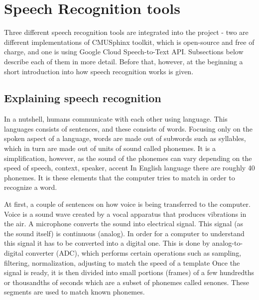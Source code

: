 \section{Speech Recognition tools}

Three different speech recognition tools are integrated into the project - two are different implementations of CMUSphinx toolkit, which is open-source and free of charge, and one is using Google Cloud Speech-to-Text API. Subsections below describe each of them in more detail. Before that, however, at the beginning a short introduction into how speech recognition works is given.

\subsection{Explaining speech recognition}

In a nutshell, humans communicate with each other using language. This languages consists of sentences, and these consists of words. Focusing only on the spoken aspect of a language, words are made out of subwords such as syllables, which in turn are made out of units of sound called phonemes. It is a simplification, however, as the sound of the phonemes can vary depending on the speed of speech, context, speaker, accent \etc In English language there are roughly 40 phonemes. It is these elements that the computer tries to match in order to recognize a word. 

At first, a couple of sentences on how voice is being transferred to the computer. Voice is a sound wave created by a vocal apparatus that produces vibrations in the air. A microphone converts the sound into electrical signal. This signal (as the sound itself) is continuous (analog). In order for a computer to understand this signal it has to be converted into a digital one. This is done by analog-to-digital converter (ADC), which performs certain operations such as sampling, filtering, normalization, adjusting to match the speed of a template \etc Once the signal is ready, it is then divided into small portions (frames) of a few hundredths or thousandths of seconds which are a subset of phonemes called senones. These segments are used to match known phonemes.

